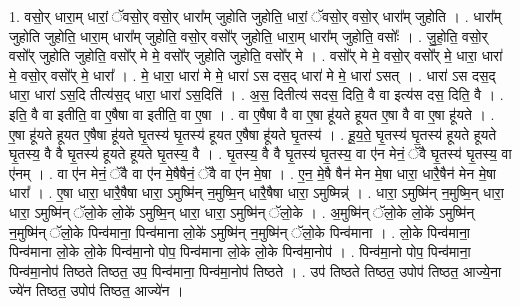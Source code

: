 \documentclass[17pt]{extarticle}
\begin{document}
1. वसो॒र् धारा॒म् धारां॒ ॅवसो॒र् वसो॒र् धारा᳚म् जुहोति जुहोति॒ धारां॒ ॅवसो॒र् वसो॒र् धारा᳚म् जुहोति । . धारा᳚म् जुहोति जुहोति॒ धारा॒म् धारा᳚म् जुहोति॒ वसो॒र् वसो᳚र् जुहोति॒ धारा॒म् धारा᳚म् जुहोति॒ वसोः᳚ । . जु॒हो॒ति॒ वसो॒र् वसो᳚र् जुहोति जुहोति॒ वसो᳚र् मे मे॒ वसो᳚र् जुहोति जुहोति॒ वसो᳚र् मे । . वसो᳚र् मे मे॒ वसो॒र् वसो᳚र् मे॒ धारा॒ धारा॑ मे॒ वसो॒र् वसो᳚र् मे॒ धारा᳚ । . मे॒ धारा॒ धारा॑ मे मे॒ धारा॑ ऽस दस॒द् धारा॑ मे मे॒ धारा॑ ऽसत् । . धारा॑ ऽस दस॒द् धारा॒ धारा॑ ऽस॒दि तीत्य॑स॒द् धारा॒ धारा॑ ऽस॒दिति॑ । . अ॒स॒ दितीत्य॑ सदस॒ दिति॒ वै वा इत्य॑स दस॒ दिति॒ वै । . इति॒ वै वा इतीति॒ वा ए॒षैषा वा इतीति॒ वा ए॒षा । . वा ए॒षैषा वै वा ए॒षा हू॑यते हूयत ए॒षा वै वा ए॒षा हू॑यते । . ए॒षा हू॑यते हूयत ए॒षैषा हू॑यते घृ॒तस्य॑ घृ॒तस्य॑ हूयत ए॒षैषा हू॑यते घृ॒तस्य॑ । . हू॒य॒ते॒ घृ॒तस्य॑ घृ॒तस्य॑ हूयते हूयते घृ॒तस्य॒ वै वै घृ॒तस्य॑ हूयते हूयते घृ॒तस्य॒ वै । . घृ॒तस्य॒ वै वै घृ॒तस्य॑ घृ॒तस्य॒ वा ए॑न मेनं॒ ॅवै घृ॒तस्य॑ घृ॒तस्य॒ वा ए॑नम् । . वा ए॑न मेनं॒ ॅवै वा ए॑न मे॒षैषैनं॒ ॅवै वा ए॑न मे॒षा । . ए॒न॒ मे॒षै षैन॑ मेन मे॒षा धारा॒ धारै॒षैन॑ मेन मे॒षा धारा᳚ । . ए॒षा धारा॒ धारै॒षैषा धारा॒ ऽमुष्मि॑न् न॒मुष्मि॒न् धारै॒षैषा धारा॒ ऽमुष्मिन्न्॑ । . धारा॒ ऽमुष्मि॑न् न॒मुष्मि॒न् धारा॒ धारा॒ ऽमुष्मि॑न् ॅलो॒के लो॒के॑ ऽमुष्मि॒न् धारा॒ धारा॒ ऽमुष्मि॑न् ॅलो॒के । . अ॒मुष्मि॑न् ॅलो॒के लो॒के॑ ऽमुष्मि॑न् न॒मुष्मि॑न् ॅलो॒के पिन्व॑माना॒ पिन्व॑माना लो॒के॑ ऽमुष्मि॑न् न॒मुष्मि॑न् ॅलो॒के पिन्व॑माना । . लो॒के पिन्व॑माना॒ पिन्व॑माना लो॒के लो॒के पिन्व॑मा॒नो पोप॒ पिन्व॑माना लो॒के लो॒के पिन्व॑मा॒नोप॑ । . पिन्व॑मा॒नो पोप॒ पिन्व॑माना॒ पिन्व॑मा॒नोप॑ तिष्ठते तिष्ठत॒ उप॒ पिन्व॑माना॒ पिन्व॑मा॒नोप॑ तिष्ठते । . उप॑ तिष्ठते तिष्ठत॒ उपोप॑ तिष्ठत॒ आज्ये॒ना ज्ये॑न तिष्ठत॒ उपोप॑ तिष्ठत॒ आज्ये॑न । \newline
\end{document}
